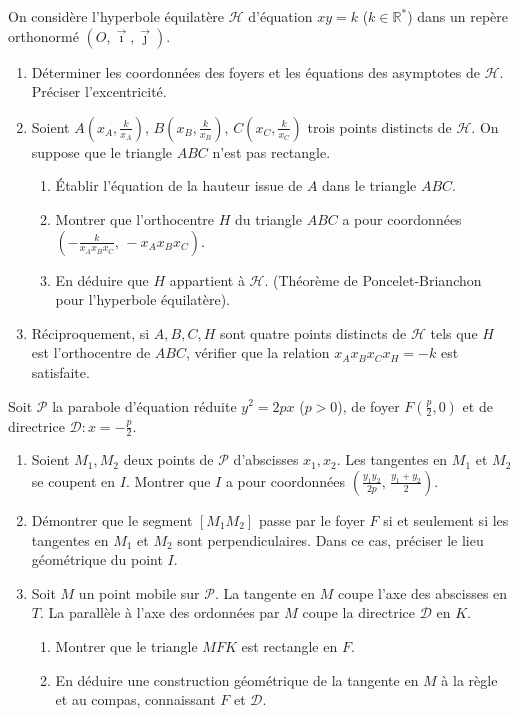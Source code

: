 \documentclass[11pt]{article}
\begin{document}
\begin{exercice}
On considère l'hyperbole équilatère $\mathcal{H}$ d'équation $xy = k$ ($k \in \mathbb{R}^*$) dans un repère orthonormé $(O,\vec{\imath},\vec{\jmath})$.
\begin{enumerate}
    \item Déterminer les coordonnées des foyers et les équations des asymptotes de $\mathcal{H}$. Préciser l'excentricité.
    \item Soient $A(x_A, \frac{k}{x_A})$, $B(x_B, \frac{k}{x_B})$, $C(x_C, \frac{k}{x_C})$ trois points distincts de $\mathcal{H}$. On suppose que le triangle $ABC$ n'est pas rectangle.
    \begin{enumerate}
        \item Établir l'équation de la hauteur issue de $A$ dans le triangle $ABC$.
        \item Montrer que l'orthocentre $H$ du triangle $ABC$ a pour coordonnées $\left(-\frac{k}{x_A x_B x_C},\, -x_A x_B x_C\right)$.
        \item En déduire que $H$ appartient à $\mathcal{H}$. (Théorème de Poncelet-Brianchon pour l'hyperbole équilatère).
    \end{enumerate}
    \item Réciproquement, si $A,B,C,H$ sont quatre points distincts de $\mathcal{H}$ tels que $H$ est l'orthocentre de $ABC$, vérifier que la relation $x_A x_B x_C x_H = -k$ est satisfaite.
\end{enumerate}
\end{exercice}

\begin{exercice}
Soit $\mathcal{P}$ la parabole d'équation réduite $y^2 = 2px$ ($p>0$), de foyer $F(\frac{p}{2},0)$ et de directrice $\mathcal{D}: x = -\frac{p}{2}$.
\begin{enumerate}
    \item Soient $M_1, M_2$ deux points de $\mathcal{P}$ d'abscisses $x_1, x_2$. Les tangentes en $M_1$ et $M_2$ se coupent en $I$. Montrer que $I$ a pour coordonnées $\left(\frac{y_1 y_2}{2p},\, \frac{y_1+y_2}{2}\right)$.
    \item Démontrer que le segment $[M_1 M_2]$ passe par le foyer $F$ si et seulement si les tangentes en $M_1$ et $M_2$ sont perpendiculaires. Dans ce cas, préciser le lieu géométrique du point $I$.
    \item Soit $M$ un point mobile sur $\mathcal{P}$. La tangente en $M$ coupe l'axe des abscisses en $T$. La parallèle à l'axe des ordonnées par $M$ coupe la directrice $\mathcal{D}$ en $K$.
    \begin{enumerate}
        \item Montrer que le triangle $MFK$ est rectangle en $F$.
        \item En déduire une construction géométrique de la tangente en $M$ à la règle et au compas, connaissant $F$ et $\mathcal{D}$.
    \end{enumerate}
\end{enumerate}
\end{exercice}
\end{document}

